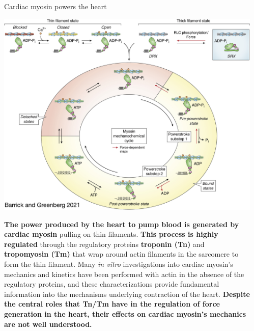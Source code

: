 \documentclass[final]{beamer}
\newlength{\sepwidth}
\newlength{\colwidth}
\newcommand{\separatorcolumn}{\begin{column}{\sepwidth}\end{column}}
\begin{document}
\begin{frame}[t]
\begin{columns}[t]
\separatorcolumn

\begin{column}{\colwidth}
  \begin{block}{Cardiac myosin powers the heart}
    \begin{center}
      \includegraphics[scale=1.65]{barrick-greenberg-xb}
      \end{center}
        \textbf{The power produced by the heart to pump blood is generated by cardiac myosin} pulling on thin filaments. \textbf{This process is highly regulated} through the regulatory proteins \textbf{troponin (Tn)} and \textbf{tropomyosin (Tm)} that wrap around actin filaments in the sarcomere to form the thin filament. Many \textit{in vitro} investigations into cardiac myosin's mechanics and kinetics have been performed with actin in the absence of the regulatory proteins, and these characterizations provide fundamental information into the mechanisms underlying contraction of the heart. \textbf{Despite the central roles that Tn/Tm have in the regulation of force generation in the heart, their effects on cardiac myosin's mechanics are not well understood.}
  \end{block}



\end{column}
\end{columns}
\end{frame}
\end{document}
